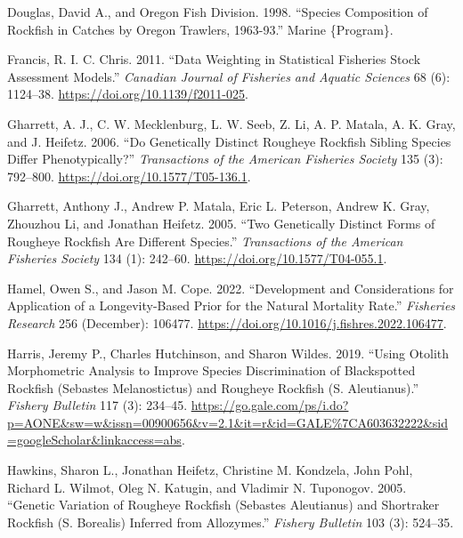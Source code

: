 \documentclass[
]{scrartcl}
\newlength{\cslhangindent}
\newenvironment{CSLReferences}[2] %
 {\begin{list}{}{%
  \setlength{\itemindent}{0pt}
  \setlength{\leftmargin}{0pt}
  \setlength{\parsep}{0pt}
  \ifodd #1
   \setlength{\leftmargin}{\cslhangindent}
   \setlength{\itemindent}{-1\cslhangindent}
  \fi
  \setlength{\itemsep}{#2\baselineskip}}}
 {\end{list}}
\begin{document}
\begin{CSLReferences}{1}{0}
Douglas, David A., and Oregon Fish Division. 1998. {``Species
Composition of Rockfish in Catches by {Oregon} Trawlers, 1963-93.''}
Marine \{Program\}.

Francis, R. I. C. Chris. 2011. {``Data Weighting in Statistical
Fisheries Stock Assessment Models.''} \emph{Canadian Journal of
Fisheries and Aquatic Sciences} 68 (6): 1124--38.
\url{https://doi.org/10.1139/f2011-025}.

Gharrett, A. J., C. W. Mecklenburg, L. W. Seeb, Z. Li, A. P. Matala, A.
K. Gray, and J. Heifetz. 2006. {``Do {Genetically} {Distinct} {Rougheye}
{Rockfish} {Sibling} {Species} {Differ} {Phenotypically}?''}
\emph{Transactions of the American Fisheries Society} 135 (3): 792--800.
\url{https://doi.org/10.1577/T05-136.1}.

Gharrett, Anthony J., Andrew P. Matala, Eric L. Peterson, Andrew K.
Gray, Zhouzhou Li, and Jonathan Heifetz. 2005. {``Two {Genetically}
{Distinct} {Forms} of {Rougheye} {Rockfish} {Are} {Different}
{Species}.''} \emph{Transactions of the American Fisheries Society} 134
(1): 242--60. \url{https://doi.org/10.1577/T04-055.1}.

Hamel, Owen S., and Jason M. Cope. 2022. {``Development and
Considerations for Application of a Longevity-Based Prior for the
Natural Mortality Rate.''} \emph{Fisheries Research} 256 (December):
106477. \url{https://doi.org/10.1016/j.fishres.2022.106477}.

Harris, Jeremy P., Charles Hutchinson, and Sharon Wildes. 2019. {``Using
Otolith Morphometric Analysis to Improve Species Discrimination of
Blackspotted Rockfish ({Sebastes} Melanostictus) and Rougheye Rockfish
({S}. Aleutianus).''} \emph{Fishery Bulletin} 117 (3): 234--45.
\url{https://go.gale.com/ps/i.do?p=AONE&sw=w&issn=00900656&v=2.1&it=r&id=GALE\%7CA603632222&sid=googleScholar&linkaccess=abs}.

Hawkins, Sharon L., Jonathan Heifetz, Christine M. Kondzela, John Pohl,
Richard L. Wilmot, Oleg N. Katugin, and Vladimir N. Tuponogov. 2005.
{``Genetic Variation of Rougheye Rockfish ({Sebastes} Aleutianus) and
Shortraker Rockfish ({S}. Borealis) Inferred from Allozymes.''}
\emph{Fishery Bulletin} 103 (3): 524--35.


\end{CSLReferences}
\end{document}
